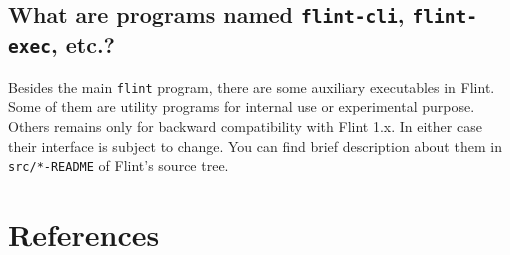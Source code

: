 \documentclass[a4paper,10pt]{report}
\begin{document}
\section{What are programs named \texttt{flint-cli}, \texttt{flint-exec}, etc.?}
\label{sec:org9625fcc}
Besides the main \texttt{flint} program, there are some auxiliary executables in
Flint. Some of them are utility programs for internal use or experimental
purpose. Others remains only for backward compatibility with Flint 1.x. In
either case their interface is subject to change. You can find brief description about
them in \texttt{src/*-README} of Flint's source tree.

\chapter{References}
\label{sec:orgd134ae5}
\end{document}
